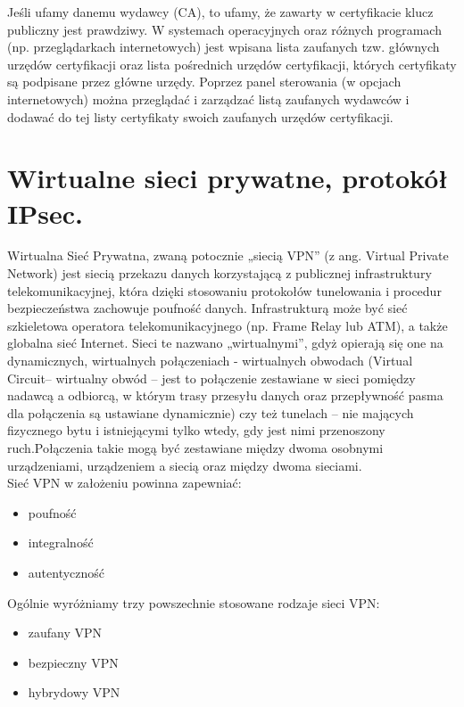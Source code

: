 \documentclass[12pt]{article}
\begin{document}
    Jeśli ufamy danemu wydawcy (CA), to ufamy, że zawarty w certyfikacie klucz publiczny jest prawdziwy.
    W systemach operacyjnych oraz różnych programach (np. przeglądarkach internetowych)
    jest wpisana lista zaufanych tzw. głównych urzędów certyfikacji oraz lista pośrednich
    urzędów certyfikacji, których certyfikaty są podpisane przez główne urzędy. Poprzez panel
    sterowania (w opcjach internetowych) można przeglądać i zarządzać listą zaufanych
    wydawców i dodawać do tej listy certyfikaty swoich zaufanych urzędów certyfikacji.

    \newpage
    \section{Wirtualne sieci prywatne, protokół IPsec.}
    Wirtualna Sieć Prywatna, zwaną potocznie „siecią VPN” (z ang. Virtual Private Network) jest siecią przekazu danych korzystającą z publicznej infrastruktury telekomunikacyjnej, która dzięki stosowaniu protokołów tunelowania i procedur bezpieczeństwa zachowuje poufność danych. Infrastrukturą może być sieć szkieletowa operatora telekomunikacyjnego (np. Frame Relay lub ATM), a także globalna sieć Internet. Sieci te nazwano „wirtualnymi”, gdyż opierają się one na dynamicznych, wirtualnych połączeniach - wirtualnych obwodach (Virtual Circuit– wirtualny obwód – jest to połączenie zestawiane w sieci pomiędzy nadawcą a odbiorcą, w którym trasy przesyłu danych oraz przepływność pasma dla połączenia są ustawiane dynamicznie) czy też tunelach – nie mających fizycznego bytu i istniejącymi tylko wtedy, gdy jest nimi przenoszony ruch.Połączenia takie mogą być zestawiane między dwoma osobnymi urządzeniami, urządzeniem a siecią oraz między dwoma sieciami.\\
    Sieć VPN w założeniu powinna zapewniać:
    \begin{itemize}
        \item poufność
        \item integralność
        \item autentyczność
    \end{itemize}
    
    Ogólnie wyróżniamy trzy powszechnie stosowane rodzaje sieci VPN:
    \begin{itemize}
        \item zaufany VPN
        \item bezpieczny VPN
        \item hybrydowy VPN
    \end{itemize}
\end{document}
